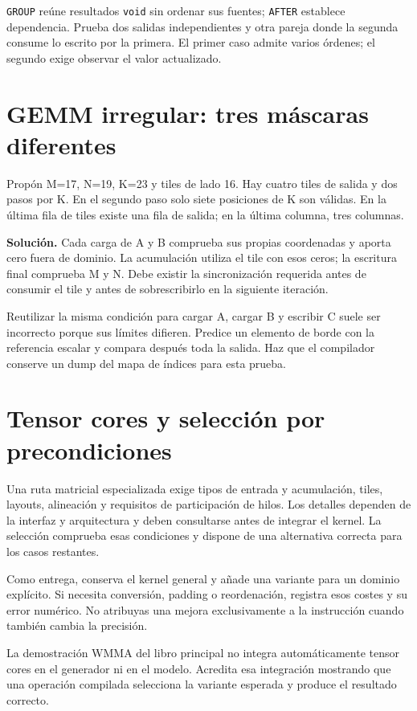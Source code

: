 \documentclass[12pt,a4paper,oneside]{report}
\begin{document}
\texttt{GROUP} reúne resultados \texttt{void} sin ordenar sus fuentes; \texttt{AFTER} establece dependencia. Prueba dos salidas independientes y otra pareja donde la segunda consume lo escrito por la primera. El primer caso admite varios órdenes; el segundo exige observar el valor actualizado.

\section{GEMM irregular: tres máscaras diferentes}
Propón M=17, N=19, K=23 y tiles de lado 16. Hay cuatro tiles de salida y dos pasos por K. En el segundo paso solo siete posiciones de K son válidas. En la última fila de tiles existe una fila de salida; en la última columna, tres columnas.

\textbf{Solución.} Cada carga de A y B comprueba sus propias coordenadas y aporta cero fuera de dominio. La acumulación utiliza el tile con esos ceros; la escritura final comprueba M y N. Debe existir la sincronización requerida antes de consumir el tile y antes de sobrescribirlo en la siguiente iteración.

Reutilizar la misma condición para cargar A, cargar B y escribir C suele ser incorrecto porque sus límites difieren. Predice un elemento de borde con la referencia escalar y compara después toda la salida. Haz que el compilador conserve un dump del mapa de índices para esta prueba.

\section{Tensor cores y selección por precondiciones}
Una ruta matricial especializada exige tipos de entrada y acumulación, tiles, layouts, alineación y requisitos de participación de hilos. Los detalles dependen de la interfaz y arquitectura y deben consultarse antes de integrar el kernel. La selección comprueba esas condiciones y dispone de una alternativa correcta para los casos restantes. \cite{cuda-guide}

Como entrega, conserva el kernel general y añade una variante para un dominio explícito. Si necesita conversión, padding o reordenación, registra esos costes y su error numérico. No atribuyas una mejora exclusivamente a la instrucción cuando también cambia la precisión.

La demostración WMMA del libro principal no integra automáticamente tensor cores en el generador ni en el modelo. Acredita esa integración mostrando que una operación compilada selecciona la variante esperada y produce el resultado correcto.
\end{document}
